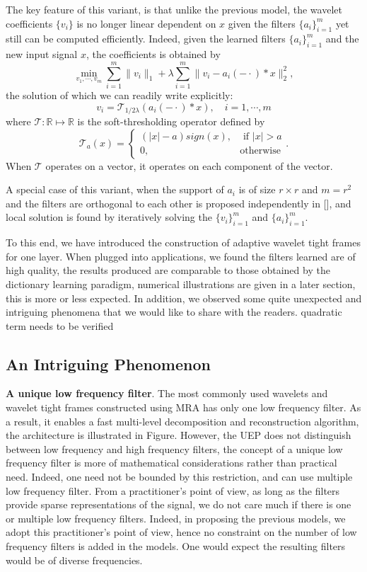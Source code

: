 \documentclass[a4paper]{article}
\begin{document}
The key feature of this variant, is that unlike the previous model, the wavelet coefficients $\{v_i\}$ is no longer linear dependent on $x$ given the filters $\{a_i\}_{i=1}^m$ yet still can be computed efficiently. Indeed, given the learned filters $\{a_i\}_{i=1}^m$ and the new input signal $x$, the coefficients is obtained by 
\[
	\min_{v_1,\cdots,v_m} \sum_{i=1}^m \|v_i\|_1 + \lambda \sum_{i=1}^m \|v_i - a_i(-\cdot)*x\|_2^2,
\]
the solution of which we can readily write explicitly:
\[
	v_i = \mathcal{T}_{1/2\lambda}( a_i(-\cdot)*x),\quad i=1,\cdots,m
\]
where $\mathcal{T}: \mathbb{R}\mapsto \mathbb{R}$ is the soft-thresholding operator defined by
\[
	\mathcal{T}_a(x)=\left\{ \begin{array}{lr}  (|x|-a)sign(x), &\textrm{ if } |x| > a \\0, &\textrm{otherwise}\end{array}\right . .
\]
When $\mathcal{T}$ operates on a vector, it operates on each component of the vector.


A special case of this variant, when the support of $a_i$ is of size $r\times r$ and $m=r^2$ and the filters are orthogonal to each other is proposed independently in [], and local solution is found by iteratively solving the $\{v_i\}_{i=1}^m$ and $\{a_i\}_{i=1}^m$.

To this end, we have introduced the construction of adaptive wavelet tight frames for one layer. When plugged into applications, we found the filters learned are of high quality, the results produced are comparable to those obtained by the dictionary learning paradigm, numerical illustrations are given in a later section, this is more or less expected.  In addition, we observed some quite unexpected and intriguing phenomena that we would like to share with the readers.
{\color{red} quadratic term needs to be verified}
\subsection{An Intriguing Phenomenon}
\textbf{A unique low frequency filter}. The most commonly used wavelets and wavelet tight frames constructed using MRA has only one low frequency filter. As a result, it enables a fast multi-level decomposition and reconstruction algorithm, the architecture is illustrated in Figure. However, the UEP does not distinguish between low frequency and high frequency filters, the concept of a unique low frequency  filter is more of mathematical considerations rather than practical need. Indeed, one need not be bounded by this restriction, and can use multiple low frequency filter. From a practitioner's point of view, as long as the filters provide sparse representations of the signal, we do not care much if there is one or multiple low frequency filters. Indeed, in proposing the previous models, we adopt this practitioner's point of view, hence no constraint on the number of low frequency filters is added in the models. One would expect the resulting filters would be of diverse frequencies.
\end{document}
